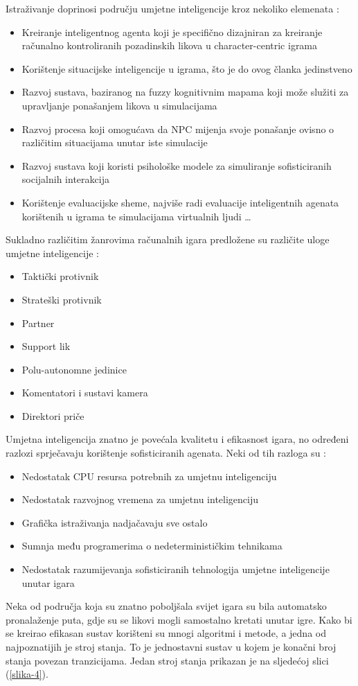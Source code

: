 \documentclass[a4paper,12pt]{foi}
\begin{document}
Istraživanje doprinosi području umjetne inteligencije kroz nekoliko elemenata \citep{NameeB2004}:
\begin{itemize}
  \item Kreiranje inteligentnog agenta koji je specifično dizajniran za kreiranje računalno kontroliranih pozadinskih likova u character-centric igrama
  \item Korištenje situacijske inteligencije u igrama, što je do ovog članka jedinstveno
  \item Razvoj sustava, baziranog na fuzzy kognitivnim mapama koji može služiti za upravljanje ponašanjem likova u simulacijama
  \item Razvoj procesa koji omogućava da NPC mijenja svoje ponašanje ovisno o različitim situacijama unutar iste simulacije
  \item Razvoj sustava koji koristi psihološke modele za simuliranje sofisticiranih socijalnih interakcija
  \item Korištenje evaluacijske sheme, najviše radi evaluacije inteligentnih agenata korištenih u igrama te simulacijama virtualnih ljudi
   \ldots
\end{itemize}
Sukladno različitim žanrovima računalnih igara predložene su različite uloge umjetne inteligencije \citep{NameeB2004}:
\begin{itemize}
\item Taktički protivnik
\item Strateški protivnik
\item Partner
\item Support lik
\item Polu-autonomne jedinice
\item Komentatori i sustavi kamera
\item Direktori priče
\end{itemize}
Umjetna inteligencija znatno je povećala kvalitetu i efikasnost igara, no određeni razlozi sprječavaju korištenje sofisticiranih agenata. Neki od tih razloga su \citep{NameeB2004}:
\begin{itemize}
\item Nedostatak CPU resursa potrebnih za umjetnu inteligenciju
\item Nedostatak razvojnog vremena za umjetnu inteligenciju
\item Grafička istraživanja nadjačavaju sve ostalo
\item Sumnja među programerima o nedeterminističkim tehnikama
\item Nedostatak razumijevanja sofisticiranih tehnologija umjetne inteligencije unutar igara
\end{itemize}
Neka od područja koja su znatno poboljšala svijet igara su bila automatsko pronalaženje puta, gdje su se likovi mogli samostalno kretati unutar igre. Kako bi se kreirao efikasan sustav korišteni su mnogi algoritmi i metode, a jedna od najpoznatijih je stroj stanja. To je jednostavni sustav u kojem je konačni broj stanja povezan tranzicijama. Jedan stroj stanja prikazan je na sljedećoj slici (\ref{slika-4}).
\end{document}
